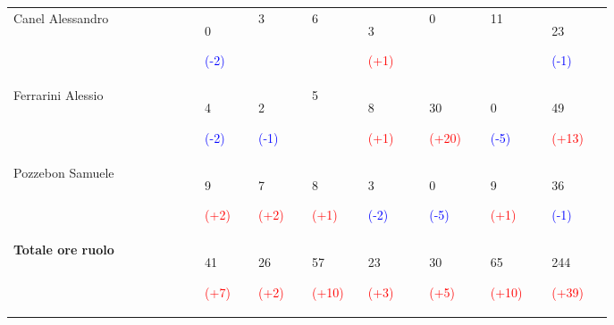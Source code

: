 {\begin{tabular}{P{0.25\linewidth}P{0.07\linewidth}P{0.07\linewidth}P{0.07\linewidth}P{0.08\linewidth}P{0.08\linewidth}P{0.08\linewidth}P{0.08\linewidth}}
            Canel Alessandro & 
            0 \par \textcolor{blue}{(-2)} & 
            3 & 
            6 & 
            3 \par \textcolor{red}{(+1)} & 
            0 & 
            11 & 
            23 \par \textcolor{blue}{(-1)}\\

            Ferrarini Alessio & 
            4 \par \textcolor{blue}{(-2)}& 
            2 \par \textcolor{blue}{(-1)} &   
            5 & 
            8 \par \textcolor{red}{(+1)} &
            30 \par \textcolor{red}{(+20)}&
            0 \par \textcolor{blue}{(-5)}& 
            49 \par \textcolor{red}{(+13)}\\

            Pozzebon Samuele & 
            9 \par \textcolor{red}{(+2)}& 
            7 \par \textcolor{red}{(+2)}&      
            8 \par \textcolor{red}{(+1)} & 
            3 \par \textcolor{blue}{(-2)}& 
            0 \par \textcolor{blue}{(-5)}&
            9 \par \textcolor{red}{(+1)} & 
            36 \par \textcolor{blue}{(-1)}\\

            \hline\hline

            \textbf{Totale ore ruolo} & 
            41 \par \textcolor{red}{(+7)} & 
            26 \par \textcolor{red}{(+2)} & 
            57 \par \textcolor{red}{(+10)} & 
            23 \par \textcolor{red}{(+3)} &
            30 \par \textcolor{red}{(+5)}& 
            65 \par \textcolor{red}{(+10)}& 
            244 \par \textcolor{red}{(+39)}\\


\end{tabular}}
